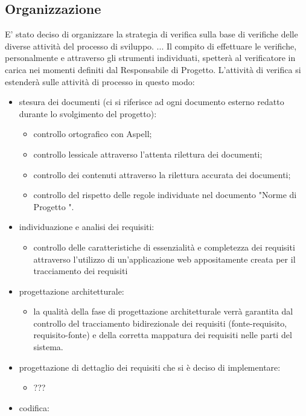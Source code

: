 \subsection{Organizzazione}
	E' stato deciso di organizzare la strategia di verifica sulla base  di verifiche delle diverse attività del processo di sviluppo.
	...
	Il compito di effettuare le verifiche, personalmente e attraverso gli strumenti individuati, spetterà al verificatore in carica nei momenti definiti dal Responsabile di Progetto.
	L'attività di verifica si estenderà sulle attività di processo in questo modo:
	\begin{itemize}
		\item stesura dei documenti (ci si riferisce ad ogni documento esterno redatto durante lo svolgimento del progetto):
			\begin{itemize}
				\item controllo ortografico con Aspell;
				\item controllo lessicale attraverso l'attenta rilettura dei documenti;
				\item controllo dei contenuti attraverso la rilettura accurata dei documenti;
				\item controllo del rispetto delle regole individuate nel documento "Norme di Progetto \lastversion".
			\end{itemize}
		\item individuazione e analisi dei requisiti:
			\begin{itemize}
				\item controllo delle caratteristiche di essenzialità e completezza dei requisiti attraverso l'utilizzo di un'applicazione web appositamente creata per il tracciamento dei requisiti
			\end{itemize}
		\item progettazione architetturale:
			\begin{itemize}
				\item la qualità della fase di progettazione architetturale verrà garantita dal controllo del tracciamento bidirezionale dei requisiti (fonte-requisito, requisito-fonte) e della corretta mappatura dei requisiti nelle parti del sistema.
			\end{itemize}
		\item progettazione di dettaglio dei requisiti che si è deciso di implementare: 
			\begin{itemize}
				\item ???
			\end{itemize}
		\item codifica: 

\end{itemize}
